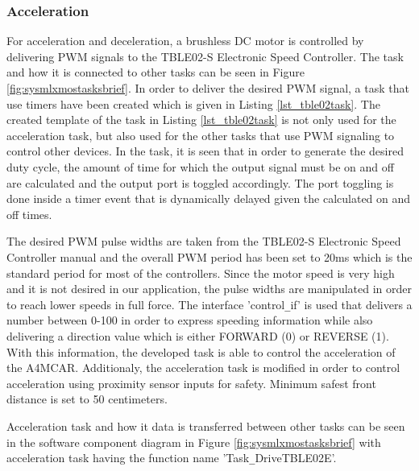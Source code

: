 \subsubsection{Acceleration}
For acceleration and deceleration, a brushless DC motor is controlled by delivering PWM signals to the TBLE02-S Electronic Speed Controller. The task and how it is connected to other tasks can be seen in Figure \ref{fig:sysmlxmostasksbrief}. In order to deliver the desired PWM signal, a task that use timers have been created which is given in Listing \ref{lst_tble02task}. The created template of the task in Listing \ref{lst_tble02task} is not only used for the acceleration task, but also used for the other tasks that use PWM signaling to control other devices. In the task, it is seen that in order to generate the desired duty cycle, the amount of time for which the output signal must be on and off are calculated and the output port is toggled accordingly. The port toggling is done inside a timer event that is dynamically delayed given the calculated on and off times.
\newpage

The desired PWM pulse widths are taken from the TBLE02-S Electronic Speed Controller manual and the overall PWM period has been set to 20ms which is the standard period for most of the controllers. Since the motor speed is very high and it is not desired in our application, the pulse widths are manipulated in order to reach lower speeds in full force. The interface 'control\texttt{\_}if' is used that delivers a number between 0-100 in order to express speeding information while also delivering a direction value which is either FORWARD (0) or REVERSE (1). With this information, the developed task is able to control the acceleration of the A4MCAR. Additionaly, the acceleration task is modified in order to control acceleration using proximity sensor inputs for safety. Minimum safest front distance is set to 50 centimeters.

Acceleration task and how it data is transferred between other tasks can be seen in the software component diagram in Figure \ref{fig:sysmlxmostasksbrief} with acceleration task having the function name 'Task\texttt{\_}DriveTBLE02E'.

